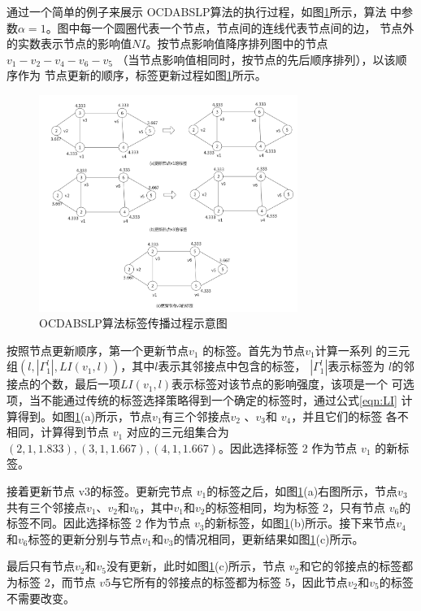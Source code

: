 通过一个简单的例子来展示 OCDABSLP算法的执行过程，如图\ref{fig:fig3-4}所示，算法
中参数$\alpha =1$。图中每一个圆圈代表一个节点，节点间的连线代表节点间的边，
节点外的实数表示节点的影响值$ NI$。按节点影响值降序排列图中的节点$v_1-v_2-v_4-v_6-v_5$
（当节点影响值相同时，按节点的先后顺序排列），以该顺序作为
节点更新的顺序，标签更新过程如图\ref{fig:fig3-4}所示。

\begin{figure}
  \centering
  \includegraphics[width=0.75\textwidth]{figures/fig3-4}
  \caption{OCDABSLP算法标签传播过程示意图}\label{fig:fig3-4}
\end{figure}

 按照节点更新顺序，第一个更新节点$v_1$
的标签。首先为节点$v_1$计算一系列
的三元组$(l,|\Gamma _1^l|,LI(v_1,l))$，其中$ l $表示其邻接点中包含的标签，
$|\Gamma _1^l|$表示标签为
$l $的邻接点的个数，最后一项$LI(v_1,l)$表示标签对该节点的影响强度，该项是一个
可选项，当不能通过传统的标签选择策略得到一个确定的标签时，通过公式\ref{eqn:LI}
计算得到。如图\ref{fig:fig3-4}(a)所示，节点$ v_1
$有三个邻接点$ v_2$
、$v_3$和 $v_4$，并且它们的标签
各不相同，计算得到节点 $v_1$
对应的三元组集合为${(2, 1, 1.833), (3, 1, 1.667), (4, 1, 
1.667)}$。因此选择标签 2 作为节点 $v_1$
的新标签。 

接着更新节点 v3的标签。更新完节点 $v_1$的标签之后，如图\ref{fig:fig3-4}(a)右图所示，节点$ v_3$共有三个邻接点$ v_1$、$v_2$和$ v_6$，其中$ v_1$和$ v_2$的标签相同，均为标签 2，只有节点 $v_6$的标签不同。因此选择标签 2 作为节点 $v_3$的新标签，如图\ref{fig:fig3-4}(b)所示。接下来节点$ v_4$和$ v_6$标签的更新分别与节点$ v_1$和$ v_3$的情况相同，更新结果如图\ref{fig:fig3-4}(c)所示。

最后只有节点$ v_2$和$ v_5$没有更新，此时如图\ref{fig:fig3-4}(c)所示，节点 $v_2$和它的邻接点的标签都为标签 2，而节点 $v5$与它所有的邻接点的标签都为标签 5，因此节点$v_2$和$ v_5$的标签不需要改变。

